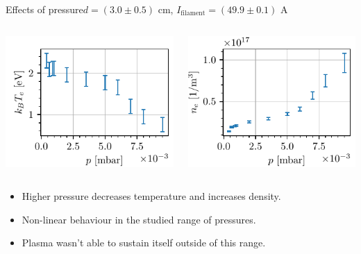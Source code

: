 \documentclass[10pt]{beamer}
\newcommand{\filamentcurrent}{\ensuremath{I_{\mathrm{filament}}}}
\begin{document}
\begin{frame}{Effects of pressure}{$d = (3.0 \pm 0.5)$ cm, $\filamentcurrent = (49.9 \pm 0.1)$ A}

    \begin{columns}
        \centering
        {\includegraphics[scale=1]{../figures/temperatureeV_pressure.pdf}}


        \centering
        {\includegraphics[scale=1]{../figures/density_pressure.pdf}}

    \end{columns}
    \begin{itemize}
        \vspace{0.5cm}
        \item Higher pressure decreases temperature and increases density.
        \item Non-linear behaviour in the studied range of pressures.
        \item Plasma wasn't able to sustain itself outside of this range.
    \end{itemize}
\end{frame}
\end{document}

